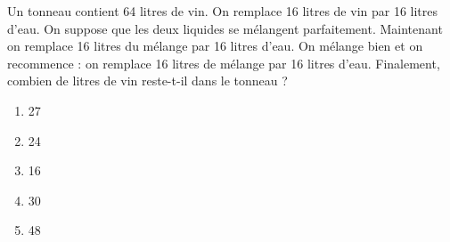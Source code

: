 Un tonneau contient 64 litres de vin. On remplace 16 litres de vin par
16 litres d'eau. On suppose que les deux liquides se mélangent
parfaitement. Maintenant on remplace 16 litres du mélange par 16
litres d'eau. On mélange bien et on recommence : on remplace 16 litres
de mélange par 16 litres d'eau. Finalement, combien de litres de vin
reste-t-il dans le tonneau ?
\begin{multicols}{5}
  \begin{enumerate}[A/]
    \item 27
    \item 24
    \item 16
    \item 30
    \item 48
  \end{enumerate}
\end{multicols}